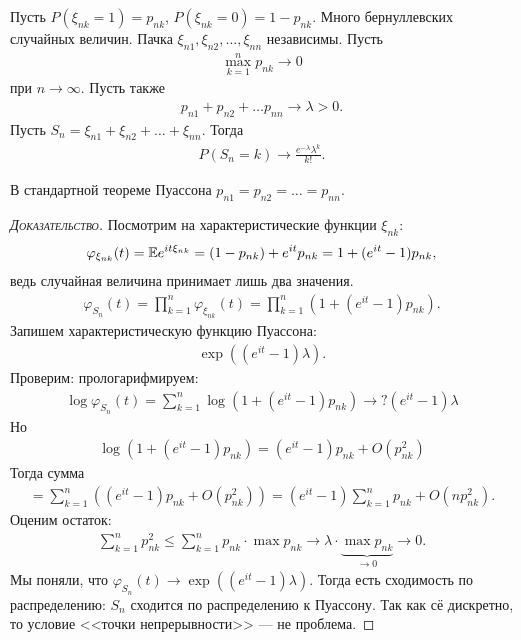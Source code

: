 \documentclass[../main.tex]{subfiles}
\begin{document}
\begin{thm}[Пуассона]
 Пусть $ P(\xi_{nk} = 1) = p_{nk} $, $ P(\xi_{nk} = 0) = 1-p_{nk} $. Много бернуллевских случайных величин. Пачка $ \xi_{n 1}, \xi_{n 2}, \ldots, \xi_{n n} $ независимы. Пусть
 \begin{align*}
  \max_{k=1}^{n} p_{nk} \to 0
 \end{align*} при $ n \to \infty $. Пусть также
 \begin{align*}
  p_{n 1}  + p_{n 2} + \ldots p_{n n} \to \lambda > 0.
 \end{align*} Пусть $ S_n = \xi_{n 1} + \xi_{n 2} + \ldots + \xi_{n n} $. Тогда
 \begin{align*}
  P(S_n = k) \to \frac{e^{-\lambda}\lambda^{k}}{k!}.
 \end{align*}
\end{thm}
В стандартной теореме Пуассона $ p_{n 1} = p_{n 2 } = \ldots = p_{n n} $.
\begin{proof}[\normalfont\textsc{Доказательство}]
 Посмотрим на характеристические функции $ \xi_{n k} $:
 \begin{align*}
  \varphi_{\xi_{n k}}(t) = \mathbb E e^{it \xi_{n k}} = (1 - p_{n k}) + e^{it} p_{n k} = 1 + (e^{it} - 1)p_{n k},
 \end{align*} ведь случайная величина принимает лишь два значения.
 \begin{align*}
  \varphi_{S_n}(t) = \prod_{k=1}^{n} \varphi_{\xi_{n k}}(t) = \prod_{k=1}^{n} (1 + (e^{it} - 1)p_{n k}).
 \end{align*} Запишем характеристическую функцию Пуассона:
 \begin{align*}
  \exp((e^{it} - 1)\lambda).
 \end{align*} Проверим: прологарифмируем:
 \begin{align*}
  \log \varphi_{S_n}(t) = \sum_{k=1}^{n}\log (1 + (e^{it} - 1)p_{nk}) \to ? (e^{it} - 1) \lambda
 \end{align*} Но
 \begin{align*}
  \log(1 + (e^{it} - 1)p_{n k}) = (e^{it} - 1)p_{n k} + O(p_{n k}^{2})
 \end{align*} Тогда сумма
 \begin{align*}
  = \sum_{k=1}^{n} \left( (e^{it}-1)p_{nk} +O(p_{nk}^{2}) \right) = (e^{it} - 1) \sum_{k=1}^{n}p_{nk} + O(np_{nk} ^{ 2}).
 \end{align*} Оценим остаток:
 \begin{align*}
	 \sum_{k=1}^{n}p_{nk}^{2} \leqslant \sum_{k=1}^{n} p_{nk} \cdot \max p_{n k} \to \lambda \cdot \underbrace{\max p_{nk}}_{\to 0} \to 0.
 \end{align*} Мы поняли, что $ \varphi_{S_n}(t) \to \exp((e^{it}-1)\lambda) $. Тогда есть сходимость по распределению: $ S_n $ сходится по распределению к Пуассону. Так как сё дискретно, то условие <<точки непрерывности>> --- не проблема.
\end{proof}
\end{document}
